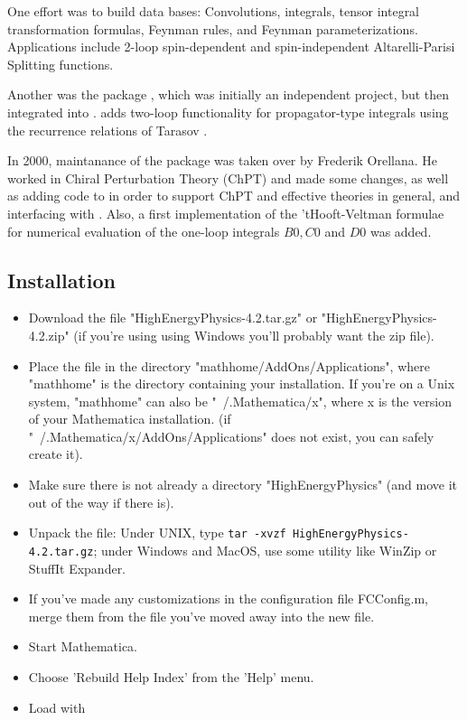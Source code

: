 One effort was to build data bases: Convolutions, integrals, tensor integral transformation formulas, Feynman rules, and Feynman parameterizations. Applications include 2-loop spin-dependent and spin-independent Altarelli-Parisi Splitting functions.

Another was the package \tarcer, which was initially an independent project, but then integrated into \fc.  \tarcer \cite{Mertig:1998vk} adds two-loop functionality for propagator-type integrals using the recurrence relations of Tarasov \cite{Tarasov:1997kx}.

In 2000, maintanance of the package was taken over by Frederik Orellana. He worked in Chiral Perturbation Theory \cite{Gasser:1984gg} (ChPT) and made some changes, as well as adding code to \fc in order to support ChPT and effective theories in general, and interfacing with \fa. Also, a first implementation of the 'tHooft-Veltman formulae \cite{'tHooft:1978xw} for numerical evaluation of the one-loop integrals $B0, C0$ and $D0$ was added.

\subsection{Installation}

\begin{itemize}

\item{Download the file "HighEnergyPhysics-4.2.tar.gz" or "HighEnergyPhysics-4.2.zip" (if you're using using Windows you'll probably want the zip file).}

\item{Place the file in the directory "mathhome/AddOns/Applications", where "mathhome" is the directory containing your \mma installation. If you're on a Unix system, "mathhome" can also be "~/.Mathematica/x", where x is the version of your Mathematica installation. (if "~/.Mathematica/x/AddOns/Applications" does not exist, you can safely create it).}

\item{Make sure there is not already a directory "HighEnergyPhysics" (and move it out of the way if there is).}

\item{Unpack the file: Under UNIX, type {\tt tar -xvzf HighEnergyPhysics-4.2.tar.gz}; under Windows and MacOS, use some utility like WinZip or StuffIt Expander.}

\item{If you've made any customizations in the configuration file FCConfig.m, merge them from the file you've moved away into the new file.}

\item{Start Mathematica.}

\item{Choose 'Rebuild Help Index' from the 'Help' menu.}

\item Load \fc with 

\end{itemize}

